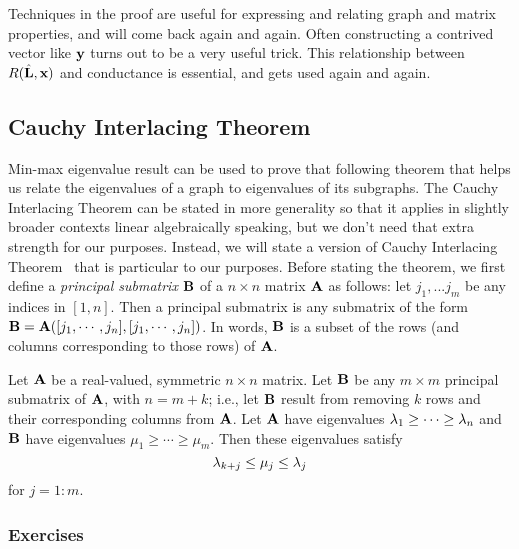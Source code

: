Techniques in the proof are useful for expressing and relating graph and matrix properties, and will come back again and again. Often constructing a contrived vector like $\textbf{y}$ turns out to be a very useful trick. This relationship between $R(\hat{\textbf{L}}, \textbf{x})$ and conductance is essential, and gets used again and again.


\subsection{Cauchy Interlacing Theorem}\label{sec:cauchy}

Min-max eigenvalue result can be used to prove that following theorem that helps us relate the eigenvalues of a graph to eigenvalues of its subgraphs. The Cauchy Interlacing Theorem can be stated in more generality so that it applies in slightly broader contexts linear algebraically speaking, but we don't need that extra strength for our purposes. Instead, we will state a version of Cauchy Interlacing Theorem~\cite{golub2012matrix} that is particular to our purposes. Before stating the theorem, we first define a \emph{principal submatrix} $\textbf{B}$ of a $n \times n$ matrix $\textbf{A}$ as follows: let $j_1, ... j_m$ be any indices in $[1, n]$. Then a principal submatrix is any submatrix of the form $\textbf{B} = \textbf{A}( [j_1, \cdots, j_n] , [j_1, \cdots, j_n] )$. In words, $\textbf{B}$ is a subset of the rows (and columns corresponding to those rows) of $\textbf{A}$.

\begin{theorem}

  Let $\textbf{A}$ be a real-valued, symmetric $n \times n$ matrix. Let $\textbf{B}$ be any $m \times m$ principal submatrix of $\textbf{A}$, with $n = m+k$; i.e., let $\textbf{B}$ result from removing $k$ rows and their corresponding columns from $\textbf{A}$.
  Let $\textbf{A}$ have eigenvalues $\lambda_1 \geq \cdots \geq \lambda_n$ and $\textbf{B}$ have eigenvalues $\mu_1 \geq \cdots \geq \mu_m.$
  Then these eigenvalues satisfy
  \[
  \lambda_{k+j} \leq \mu_j \leq \lambda_j
  \]
  for $j=1:m$.

\end{theorem}


\subsubsection{Exercises}\label{sec:fundamentals:eigen2:exercises}

